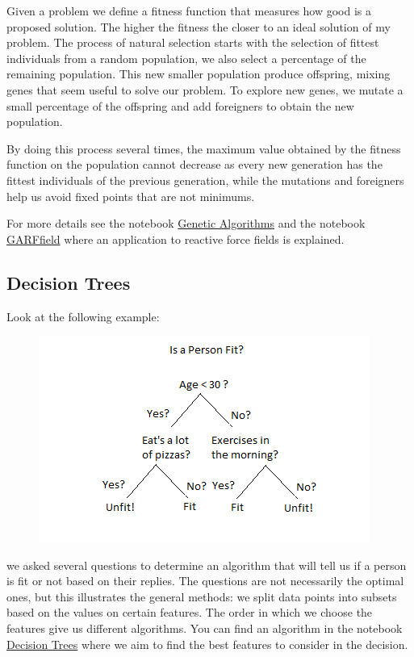 \documentclass[11pt,letterpaper]{report}
\begin{document}
Given a problem we define a fitness function that measures how good is a proposed solution. The higher the fitness the closer to an ideal solution of my problem.
The process of natural selection starts with the selection of fittest individuals from a random population, we also select a percentage of the remaining population. This new smaller population produce offspring, mixing genes that seem useful to solve our problem. To explore new genes, we mutate a small percentage of the offspring and add foreigners to obtain the new population.

By doing this process several times, the maximum value obtained by the fitness function on the population cannot  decrease as every new generation has the fittest individuals of the previous generation, while the mutations and foreigners help us avoid fixed points that are not minimums. 

		
For more details see the notebook \href{ http://nbviewer.jupyter.org/mendozacortesgroup/machine_learning_class/blob/master/Lectures_Jupyter/L4_Genetic_Algorithms/Genetic\%20Algorithms.ipynb}{ Genetic Algorithms} and the notebook \href{ http://nbviewer.jupyter.org/mendozacortesgroup/machine_learning_class/blob/master/Lectures_Jupyter/L4_Genetic_Algorithms/GARFfield.ipynb}{GARFfield} where an application to reactive force fields is explained.
 
	 \subsection{Decision Trees}
 
Look at the following example: 
 \begin{figure}[h!]
 	\centering
 	\includegraphics[width=0.45\linewidth]{figures/Decision-Trees.png}
 	\caption{}
 	\label{fig:Trees}
 \end{figure} 	
 
 we asked several questions to determine an algorithm that will tell us if a person is fit or not based on their replies. The questions are not necessarily the optimal ones, but this illustrates the general methods:  we split data points into subsets based on the values on certain features. The order in which we choose the features give us different algorithms. You can find an algorithm in the notebook \href{ http://nbviewer.jupyter.org/mendozacortesgroup/machine_learning_class/blob/master/Lectures_Jupyter/L3_Decisions_Trees/L3_Decision_Trees.ipynb}{Decision Trees} where we aim to find the best features to consider in the decision.
\end{document}
